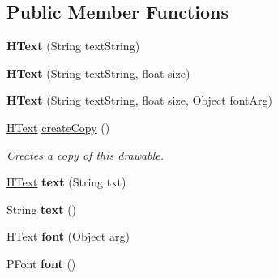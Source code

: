 \subsection*{Public Member Functions}
\begin{DoxyCompactItemize}
\item 
\hypertarget{classhype_1_1drawable_1_1_h_text_ac9b84354f82c63669dd676eb988b6425}{{\bfseries H\-Text} (String text\-String)}\label{classhype_1_1drawable_1_1_h_text_ac9b84354f82c63669dd676eb988b6425}

\item 
\hypertarget{classhype_1_1drawable_1_1_h_text_a670828657fd6d3443dc99d404b6436a3}{{\bfseries H\-Text} (String text\-String, float size)}\label{classhype_1_1drawable_1_1_h_text_a670828657fd6d3443dc99d404b6436a3}

\item 
\hypertarget{classhype_1_1drawable_1_1_h_text_af39e7ea27726741693fd6c957ccd02cf}{{\bfseries H\-Text} (String text\-String, float size, Object font\-Arg)}\label{classhype_1_1drawable_1_1_h_text_af39e7ea27726741693fd6c957ccd02cf}

\item 
\hyperlink{classhype_1_1drawable_1_1_h_text}{H\-Text} \hyperlink{classhype_1_1drawable_1_1_h_text_ae908bda8c33aa5a70e82e4ae1b8f3187}{create\-Copy} ()
\begin{DoxyCompactList}\small\item\em Creates a copy of this drawable. \end{DoxyCompactList}\item 
\hypertarget{classhype_1_1drawable_1_1_h_text_a647993e931bb74cdf36ff2eb7d3ed30f}{\hyperlink{classhype_1_1drawable_1_1_h_text}{H\-Text} {\bfseries text} (String txt)}\label{classhype_1_1drawable_1_1_h_text_a647993e931bb74cdf36ff2eb7d3ed30f}

\item 
\hypertarget{classhype_1_1drawable_1_1_h_text_ae5d3e5e1a7d0cc2578327408936dd740}{String {\bfseries text} ()}\label{classhype_1_1drawable_1_1_h_text_ae5d3e5e1a7d0cc2578327408936dd740}

\item 
\hypertarget{classhype_1_1drawable_1_1_h_text_a539acc29624f344e82c7a43e342ec927}{\hyperlink{classhype_1_1drawable_1_1_h_text}{H\-Text} {\bfseries font} (Object arg)}\label{classhype_1_1drawable_1_1_h_text_a539acc29624f344e82c7a43e342ec927}

\item 
\hypertarget{classhype_1_1drawable_1_1_h_text_a273e812e78225a53012e00595543591d}{P\-Font {\bfseries font} ()}\label{classhype_1_1drawable_1_1_h_text_a273e812e78225a53012e00595543591d}


\end{DoxyCompactItemize}
